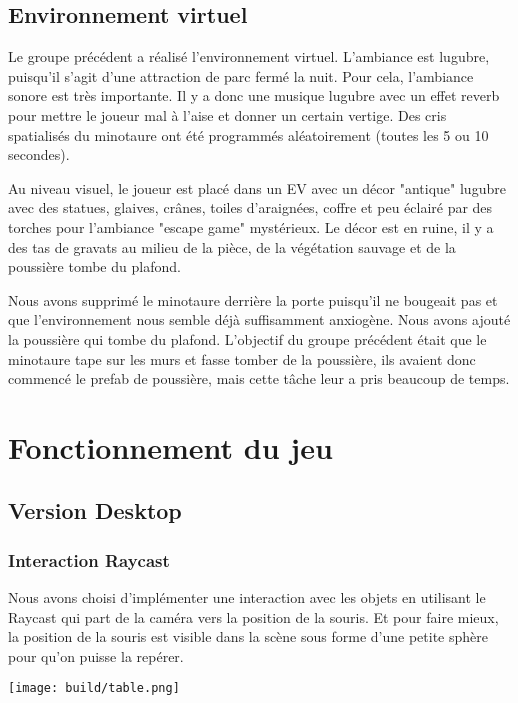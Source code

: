 \documentclass[12pt]{article}
\begin{document}
\subsection{Environnement virtuel}
Le groupe précédent a réalisé l'environnement virtuel. L’ambiance est lugubre, puisqu’il s’agit d’une attraction de parc fermé la nuit. Pour cela, l’ambiance sonore est très importante. Il y a donc une musique lugubre avec un effet reverb pour mettre le joueur mal à l’aise et donner un certain vertige. Des cris spatialisés du minotaure ont été programmés aléatoirement (toutes les 5 ou 10 secondes).

Au niveau visuel, le joueur est placé dans un EV avec un décor "antique" lugubre avec des statues, glaives, crânes, toiles d’araignées, coffre et peu éclairé par des torches pour l’ambiance "escape game" mystérieux. Le décor est en ruine, il y a des tas de gravats au milieu de la pièce, de la végétation sauvage et de la poussière tombe du plafond.

Nous avons supprimé le minotaure derrière la porte puisqu’il ne bougeait pas et que l’environnement nous semble déjà suffisamment anxiogène. Nous avons ajouté la poussière qui tombe du plafond. L’objectif du groupe précédent était que le minotaure tape sur les murs et fasse tomber de la poussière, ils avaient donc commencé le prefab de poussière, mais cette tâche leur a pris beaucoup de temps.

\section{Fonctionnement du jeu}
\subsection{Version Desktop}
\subsubsection{Interaction Raycast}
Nous avons choisi d’implémenter une interaction avec les objets en utilisant le Raycast qui part de la caméra vers la position de la souris. Et pour faire mieux, la position de la souris est visible dans la scène sous forme d’une petite sphère pour qu’on puisse la repérer.

\begin{center}
    \texttt{[image: build/table.png]}
\end{center}
\end{document}
